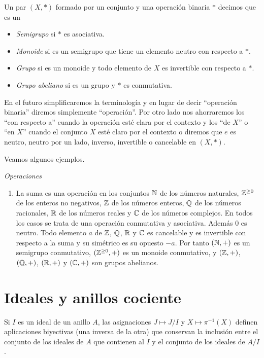 Un par $(X,*)$ formado por un conjunto y una operación binaria $*$ decimos que es un
\begin{itemize}
    \item {\it Semigrupo} si $*$ es asociativa.
    \item {\it Monoide} si es un semigrupo que tiene un elemento neutro con respecto a $*$.
    \item {\it Grupo} si es un monoide y todo elemento de $X$ es invertible con respecto a $*$.
    \item {\it Grupo abeliano} si es un grupo y $*$ es conmutativa.
\end{itemize}

En el futuro simplificaremos la terminología y en lugar de decir ``operación binaria'' diremos simplemente ``operación''. Por otro lado nos ahorraremos los ``con respecto a'' cuando la operación esté clara por el contexto y los ``de $X$'' o ``en $X$'' cuando el conjunto $X$ esté claro por el contexto o diremos que $e$ es neutro, neutro por un lado, inverso, invertible o cancelable en $(X,*)$.

Veamos algunos ejemplos.

\begin{ejs}{\it Operaciones}
    \begin{enumerate}[label=(\arabic*)]
        \item La suma es una operación en los conjuntos $\mathbb{N}$ de los números naturales, $\mathbb{Z}^{\geq 0}$ de los enteros no negativos, $\mathbb{Z}$ de los números enteros, $\mathbb{Q}$ de los números racionales, $\mathbb{R}$ de los números reales y $\mathbb{C}$ de los números complejos. En todos los casos se trata de una operación conmutativa y asociativa. Además $0$ es neutro. Todo elemento $a$ de $\mathbb{Z}$, $\mathbb{Q}$, $\mathbb{R}$ y $\mathbb{C}$ es cancelable y es invertible con respecto a la suma y su simétrico es su opuesto $-a$. Por tanto $(\mathbb{N}, +)$ es un semigrupo conmutativo, $(\mathbb{Z}^{\geq 0}, +)$ es un monoide conmutativo, y $(\mathbb{Z}, +)$, $(\mathbb{Q}, +)$, $(\mathbb{R}, +)$ y $(\mathbb{C}, +)$ son grupos abelianos.
    \end{enumerate}
\end{ejs}




\section{Ideales y anillos cociente}

\begin{teo}\label{anillos:teo:1} Si $I$ es un ideal de un anillo $A$, las asignaciones $J\mapsto J/I$ y $X\mapsto\pi^{-1}(X)$ definen aplicaciones biyectivas (una inversa de la otra) que conservan la inclusión entre el conjunto de los ideales de $A$ que contienen al $I$ y el conjunto de los ideales de $A/I$.
\end{teo}


